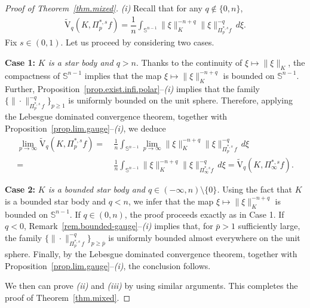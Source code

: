\documentclass[11pt, reqno]{article}
\theoremstyle{definition}
\numberwithin{equation}{section}
\newcommand{\Sphere}{\mathbb{S}^{n - 1}}
\newcommand{\vtil}{\widetilde{\mathrm{V}}}
\begin{document}
\begin{proof}[Proof of Theorem~\ref{thm.mixed}]
\textit{(i)} Recall  that for any $q \not\in \{ 0, n \}$, 
\begin{align*}
	\vtil_{q}(K,  \Pi^{\ast, s}_p  f) = \dfrac{1}{n} \int_{\Sphere} \| \xi \|^{- n + q}_K \| \xi \|^{-q}_{\Pi^{\ast, s}_p f} \, d\xi.
\end{align*}
Fix $s \in (0, 1)$.
Let us proceed by considering two cases.

\smallskip

\textbf{Case 1:} \textit{$K$ is a star body and $q > n$}. 
Thanks to the continuity of $\xi \mapsto \| \xi \|_K$, the compactness of $\Sphere$ implies that the map $\xi \mapsto \| \xi \|_K^{- n + q}$ is bounded on $\Sphere$.
Further, Proposition~\ref{prop.exist.infi.polar}--\textit{(i)} implies that the family $\big\{ \| \cdot \|_{\Pi^{\ast, s}_p \, f}^{-q} \big\}_{p \geq 1}$ is uniformly bounded on the unit sphere.
Therefore, applying the Lebesgue dominated convergence theorem, together with Proposition~\ref{prop.lim.gauge}--\textit{(i)}, we deduce 
\begin{align*}
	\lim_{p \to \infty} \vtil_{q}(K, \Pi^{\ast, s}_p f) = & ~ \frac{1}{n} \int_{\Sphere} \lim_{p \to \infty} \| \xi \|^{- n + q}_K \| \xi \|^{-q}_{\Pi^{\ast, s}_p \, f} \, d\xi \\
    = & ~  \frac{1}{n} \int_{\Sphere} \| \xi \|^{- n + q}_K \| \xi \|^{-q}_{\Pi^{\ast, s}_\infty f} \, d\xi =  \vtil_{q}(K, \Pi^{\ast, s}_\infty  f).
\end{align*}

\medskip

\textbf{Case 2:} \textit{ $K$ is a bounded star body and $q \in (- \infty, n) \setminus \{ 0 \}$.}
Using the fact that $K$ is a bounded star body and $q < n$, we infer that the map $\xi \mapsto \| \xi \|_K^{- n + q}$ is bounded on $\Sphere$.
If $q \in (0, n)$, the proof proceeds exactly as in Case 1.
If $q < 0$, Remark~\ref{rem.bounded-gauge}--\textit{(i)} implies that, for $\bar p > 1$ sufficiently large, the family $\big\{ \| \cdot \|_{\Pi^{\ast, s}_p \, f}^{-q} \big\}_{p \geq \bar p}$ is uniformly bounded almost everywhere on the unit sphere.
Finally, by the Lebesgue dominated convergence theorem, together with Proposition~\ref{prop.lim.gauge}--\textit{(i)}, the conclusion follows.

\medskip

We then can prove \textit{(ii)} and \textit{(iii)} by using similar arguments.
This completes the proof of Theorem~\ref{thm.mixed}.
\end{proof}
\end{document}
